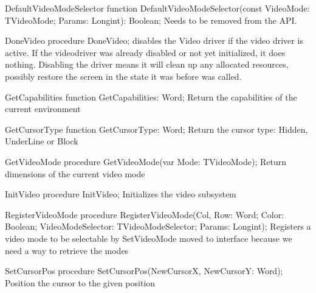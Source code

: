\begin{procedure}{DefaultVideoModeSelector}
\Declaration
function DefaultVideoModeSelector(const VideoMode: TVideoMode; Params: Longint): Boolean;
\Description
Needs to be removed from the API.
\Errors
\SeeAlso
\end{procedure}

\begin{procedure}{DoneVideo}
\Declaration
procedure DoneVideo; 
\Description
{} disables the Video driver if the video driver is active. If
the videodriver was already disabled or not yet initialized, it does
nothing. Disabling the driver means it will clean up any allocated
resources, possibly restore the screen in the state it was before
 was called.
\Errors
\SeeAlso
\end{procedure}

\begin{function}{GetCapabilities}
\Declaration
function  GetCapabilities: Word; 
\Description
{ Return the capabilities of the current environment }
\Errors
\SeeAlso
\end{function}

\begin{function}{GetCursorType}
\Declaration
function GetCursorType: Word; 
\Description
{ Return the cursor type: Hidden, UnderLine or Block }
\Errors
\SeeAlso
\end{function}

\begin{procedure}{GetVideoMode}
\Declaration
procedure GetVideoMode(var Mode: TVideoMode); 
\Description
{ Return dimensions of the current video mode }
\Errors
\SeeAlso
\end{procedure}

\begin{procedure}{InitVideo}
\Declaration
procedure InitVideo; 
\Description
{ Initializes the video subsystem }
\Errors
\SeeAlso
\end{procedure}

\begin{procedure}{RegisterVideoMode}
\Declaration
procedure RegisterVideoMode(Col, Row: Word; Color: Boolean; VideoModeSelector: TVideoModeSelector; Params: Longint); 
\Description
{ Registers a video mode to be selectable by SetVideoMode } 
{ moved to interface because we need a way to retrieve the modes }
\Errors
\SeeAlso
\end{procedure}

\begin{procedure}{SetCursorPos}
\Declaration
procedure SetCursorPos(NewCursorX, NewCursorY: Word); 
\Description
{ Position the cursor to the given position }
\Errors
\SeeAlso
\end{procedure}

